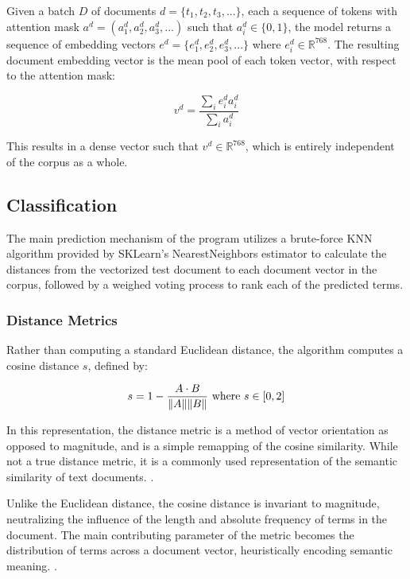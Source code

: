 \documentclass[11pt]{article} %
\theoremstyle{plain}
\theoremstyle{definition}
\begin{document}
Given a batch \(D\) of documents \(d = \{t_1, t_2, t_3, ...\}\), each a sequence of tokens with attention mask \(a^d = (a^d_1, a^d_2, a^d_3, ...)\) such that \(a^d_i \in \{0, 1\}\), the model returns a sequence of embedding vectors \(e^d = \{e^d_1, e^d_2, e^d_3,...\}\) where \(e^d_i \in \mathbb{R}^{768}\). \cite{gu/2021/domainspecific}\cite{devlin/2018/bert} The resulting document embedding vector is the mean pool of each token vector, with respect to the attention mask:

\[v^d = \frac{\sum_{i} e^d_ia^d_i}{\sum_{i} a^d_i}\]

This results in a dense vector such that \(v^d \in \mathbb{R}^{768}\), which is entirely independent of the corpus as a whole.

\subsection{Classification}

The main prediction mechanism of the program utilizes a brute-force KNN algorithm provided by SKLearn's NearestNeighbors estimator to calculate the distances from the vectorized test document to each document vector in the corpus, followed by a weighed voting process to rank each of the predicted terms.

\subsubsection{Distance Metrics}

Rather than computing a standard Euclidean distance, the algorithm computes a cosine distance \(s\), defined by:

\[ s = 1 -  \frac{A \cdot B}{\Vert A \Vert \Vert B \Vert}\ \textnormal{where} \  s \in [0, 2] \]

In this representation, the distance metric is a method of vector orientation as opposed to magnitude, and is a simple remapping of the cosine similarity. While not a true distance metric, it is a commonly used representation of the semantic similarity of text documents. \cite{you/2025/semantics}.

Unlike the Euclidean distance, the cosine distance is invariant to magnitude, neutralizing the influence of the length and absolute frequency of terms in the document. The main contributing parameter of the metric becomes the distribution of terms across a document vector, heuristically encoding semantic meaning. \cite{you/2025/semantics}.
\end{document}
